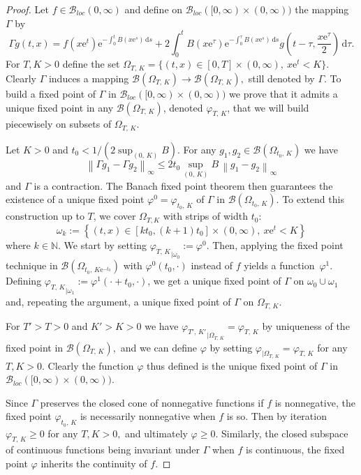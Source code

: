 \documentclass[AHL,Unicode,longabstracts,published]{cedram}
\renewcommand{\leq}{\leqslant}
\renewcommand{\geq}{\geqslant}
\newcommand{\B}{\mathcal{B}}
\newcommand{\N}{\mathbb{N}}
\newcommand{\1}{\mathds{1}}
\newcommand{\e}{\mathrm{e}}
\renewcommand{\d}{\mathrm{d}}
\begin{document}

\begin{proof}
Let $f\in\B_{loc}(0,\infty)$ and define on $\B_{loc}([0,\infty)\times(0,\infty))$ the mapping $\Gamma$ by
\[
\Gamma g(t,x)=f\left(x\e^t\right)\e^{-\int_0^t B\left(x\e^s\right)\,\d s} + 2\int_0^t B\left(x\e^\tau\right)\e^{-\int_0^\tau B\left(x\e^s\right)\,\d s} g\left(t-\tau,\frac{x\e^\tau}{2}\right)\,\d\tau.
\]
For $T,K>0$ define the set $\Omega_{T,\,K}=\{(t,x)\in[0,T]\times(0,\infty),\ x\e^t<K\}.$ Clearly $\Gamma$ induces a mapping $\B(\Omega_{T,\,K})\to\B(\Omega_{T,\,K}),$ still denoted by $\Gamma.$ To build a fixed point of $\Gamma$ in $\B_{loc}([0,\infty)\times(0,\infty))$ we prove that it admits a unique fixed point in any $\B(\Omega_{T,\,K})$, denoted $\varphi_{T,\,K}$, that we will build piecewisely on subsets of $\Omega_{T,\,K}$.


Let $K>0$ and $t_0<1/(2\sup_{(0,\,K)}B).$ For any $g_1,g_2\in\B(\Omega_{t_0,\,K})$ we have
\[
\left\|\Gamma g_1-\Gamma g_2\right\|_\infty\leq2t_0 \sup_{(0,\,K)}\!B\,\left\|g_1-g_2\right\|_\infty
\]
and $\Gamma$ is a contraction. The Banach fixed point theorem then guarantees the existence of a unique fixed point $\varphi^0=\varphi_{t_0,\,K}$ of $\Gamma$ in $\B(\Omega_{t_0,\,K}).$ To extend this construction up to $T$, we cover $\Omega_{T,K}$ with strips of width $t_0$:
\[
\omega_k := \left\{(t,x)\in \left[kt_0,(k+1)t_0\right]\times (0,\infty),\ x\e^t < K\right\}
\]
where $k\in\N$. We start by setting ${\varphi_{T,\,K}}_{|\omega_0} := \varphi^0$. Then, applying the fixed point technique in $\B(\Omega_{t_0,\,K\e^{-t_0}})$ with $\varphi^0(t_0,\cdot)$ instead of $f$ yields a function~$\varphi^1$. Defining ${\varphi_{T,\,K}}_{|\omega_1} := \varphi^1(\cdot + t_0,\cdot)$, we get a unique fixed point of $\Gamma$ on $\omega_0 \cup \omega_1$ and, repeating the argument, a unique fixed point of $\Gamma$ on $\Omega_{T,\,K}$.


For $T'>T>0$ and $K'>K>0$ we have ${\varphi_{T',\,K'}}_{|\Omega_{T,\,K}}=\varphi_{T,\,K}$ by uniqueness of the fixed point in $\B(\Omega_{T,\,K}),$ and we can define $\varphi$ by setting $\varphi_{|\Omega_{T,\,K}}=\varphi_{T,\,K}$ for any $T,K>0.$ Clearly the function $\varphi$ thus defined is the unique fixed point of $\Gamma$ in $\B_{loc}([0,\infty)\times(0,\infty)).$


Since $\Gamma$ preserves the closed cone of nonnegative functions if $f$ is nonnegative, the fixed point $\varphi_{t_0,\,K}$ is necessarily nonnegative when $f$ is so. Then by iteration $\varphi_{T,\,K}\geq0$ for any $T,K>0,$ and ultimately $\varphi\geq0$. Similarly, the closed subspace of continuous functions being invariant under $\Gamma$ when $f$ is continuous, the fixed point $\varphi$ inherits the continuity of $f$.


\end{proof}
\end{document}
